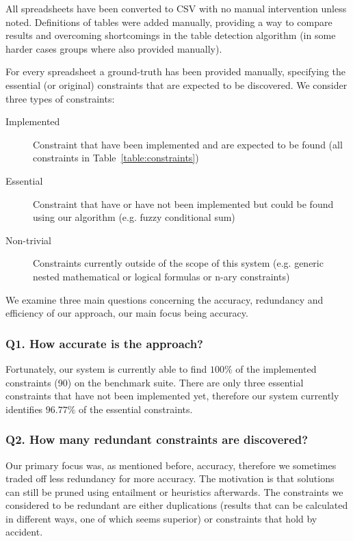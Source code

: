 \documentclass{IEEEtran}
\theoremstyle{definition}
\begin{document}
All spreadsheets have been converted to CSV with no manual intervention unless noted.
Definitions of tables were added manually, providing a way to compare results and overcoming shortcomings in the table detection algorithm (in some harder cases groups where also provided manually).

For every spreadsheet a ground-truth has been provided manually, specifying the essential (or original) constraints that are expected to be discovered.
We consider three types of constraints:
\begin{description}
  \item[Implemented] Constraint that have been implemented and are expected to be found (all constraints in Table~\ref{table:constraints})
  \item[Essential] Constraint that have or have not been implemented but could be found using our algorithm (e.g. fuzzy conditional sum)
  \item[Non-trivial] Constraints currently outside of the scope of this system (e.g. generic nested mathematical or logical formulas or n-ary constraints)
\end{description}

We examine three main questions concerning the accuracy, redundancy and efficiency of our approach, our main focus being accuracy.

\subsubsection*{Q1. How accurate is the approach?}
Fortunately, our system is currently able to find $100\%$ of the implemented constraints (90) on the benchmark suite.
There are only three essential constraints that have not been implemented yet, therefore our system currently identifies $96.77\%$ of the essential constraints.

\subsubsection*{Q2. How many redundant constraints are discovered?}
Our primary focus was, as mentioned before, accuracy, therefore we sometimes traded off less redundancy for more accuracy.
The motivation is that solutions can still be pruned using entailment or heuristics afterwards.
The constraints we considered to be redundant are either duplications (results that can be calculated in different ways, one of which seems superior) or constraints that hold by accident.
\end{document}
